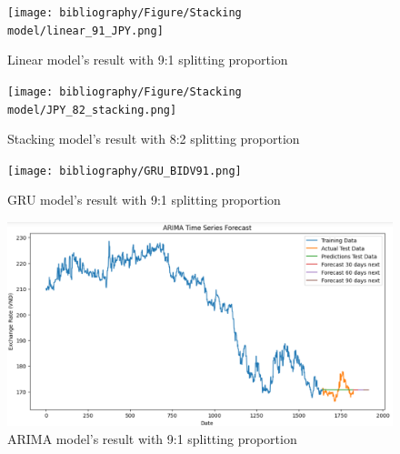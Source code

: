 \documentclass{ieeeojies}
\begin{document}
\begin{figure}[H]
  \centering
  \begin{minipage}{0.8\linewidth}
    \centering
    \texttt{[image: bibliography/Figure/Stacking model/linear\_91\_JPY.png]}
    \caption{Linear model's result with 9:1 splitting proportion}
    \label{fig22}
  \end{minipage}
\end{figure}
\begin{figure}[H]
  \centering
  \begin{minipage}{0.8\linewidth}
    \centering
    \texttt{[image: bibliography/Figure/Stacking model/JPY\_82\_stacking.png]}
    \caption{Stacking model's result with 8:2 splitting proportion}
    \label{fig23}
  \end{minipage}
\end{figure}
\begin{figure}[H]
  \centering
  \begin{minipage}{0.8\linewidth}
    \centering
    \texttt{[image: bibliography/GRU\_BIDV91.png]}
    \caption{GRU model's result with 9:1 splitting proportion}
    \label{fig24}
  \end{minipage}
\end{figure}
\begin{figure}[H]
  \centering
  \begin{minipage}{0.8\linewidth}
    \centering
    \includegraphics[width=\linewidth]{ARIMA_JPY.png}
    \caption{ARIMA model's result with 9:1 splitting proportion}
    \label{fig25}
  \end{minipage}
\end{figure}
\end{document}
